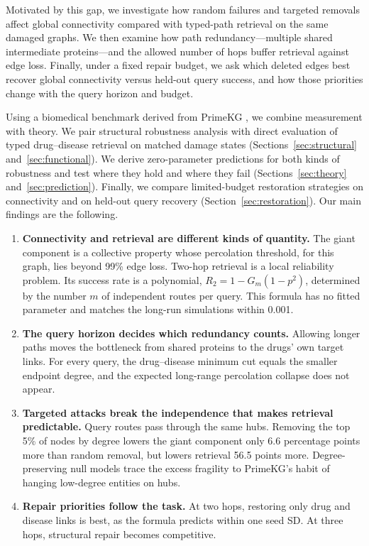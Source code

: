 Motivated by this gap, we investigate how random failures and targeted
removals affect global connectivity compared with typed-path retrieval on
the same damaged graphs. We then examine how path redundancy---multiple
shared intermediate proteins---and the allowed number of hops buffer
retrieval against edge loss. Finally, under a fixed repair budget, we ask
which deleted edges best recover global connectivity versus held-out query
success, and how those priorities change with the query horizon and budget.

Using a biomedical benchmark derived from PrimeKG \cite{chandak2023primekg},
we combine measurement with theory. We pair structural robustness analysis
with direct evaluation of typed drug--disease retrieval on matched damage
states (Sections~\ref{sec:structural} and~\ref{sec:functional}). We derive
zero-parameter predictions for both kinds of robustness and test where they
hold and where they fail (Sections~\ref{sec:theory} and~\ref{sec:prediction}).
Finally, we compare limited-budget restoration strategies on connectivity and
on held-out query recovery (Section~\ref{sec:restoration}). Our main findings
are the following.
\begin{enumerate}[leftmargin=*,itemsep=2pt]
\item \textbf{Connectivity and retrieval are different kinds of quantity.}
The giant component is a collective property whose percolation threshold, for
this graph, lies beyond 99\% edge loss. Two-hop retrieval is a local
reliability problem. Its success rate is a polynomial,
$R_2=1-G_m(1-p^2)$, determined by the number $m$ of independent routes per
query. This formula has no fitted parameter and matches the long-run
simulations within 0.001.
\item \textbf{The query horizon decides which redundancy counts.} Allowing
longer paths moves the bottleneck from shared proteins to the drugs' own target
links. For every query, the drug--disease minimum cut equals the smaller
endpoint degree, and the expected long-range percolation collapse does not
appear.
\item \textbf{Targeted attacks break the independence that makes retrieval
predictable.} Query routes pass through the same hubs. Removing the top 5\% of
nodes by degree lowers the giant component only 6.6 percentage points more
than random removal, but lowers retrieval 56.5 points more. Degree-preserving
null models trace the excess fragility to PrimeKG's habit of hanging
low-degree entities on hubs.
\item \textbf{Repair priorities follow the task.} At two hops, restoring only
drug and disease links is best, as the formula predicts within one seed SD.
At three hops, structural repair becomes competitive.
\end{enumerate}
